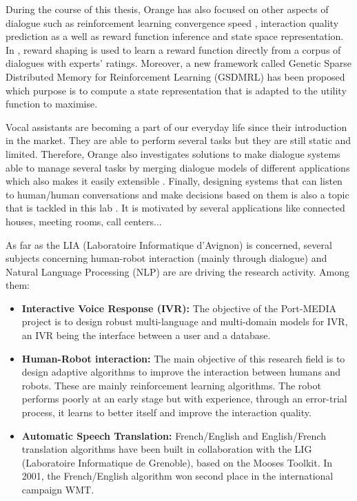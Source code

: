                 During the course of this thesis, Orange has also focused on other aspects of dialogue such as reinforcement learning convergence speed \cite{El-Asri2013a}, interaction quality prediction \cite{El-Asri2012,El-Asri2014d} as a well as reward function inference and state space representation. In \cite{El-Asri2012}, reward shaping is used to learn a reward function directly from a corpus of dialogues with experts' ratings. Moreover, a new framework called Genetic Sparse Distributed Memory for Reinforcement Learning (GSDMRL) has been proposed \cite{El-Asri2016} which purpose is to compute a state representation that is adapted to the utility function to maximise.
								
								Vocal assistants are becoming a part of our everyday life since their introduction in the market. They are able to perform several tasks but they are still static and limited. Therefore, Orange also investigates solutions to make dialogue systems able to manage several tasks by merging dialogue models of different applications which also makes it easily extensible \cite{EkeinhorKomi2014}. Finally, designing systems that can listen to human/human conversations and make decisions based on them is also a topic that is tackled in this lab \cite{Barlier2015}. It is motivated by several applications like connected houses, meeting rooms, call centers...

                As far as the LIA (Laboratoire Informatique d'Avignon) is concerned, several subjects concerning human-robot interaction (mainly through dialogue) and Natural Language Processing (NLP) are are driving the research activity. Among them:

                \begin{itemize}
                  \item \textbf{Interactive Voice Response (IVR):} The objective of the Port-MEDIA project is to design robust multi-language and multi-domain models for IVR, an IVR being the interface between a user and a database.
                  \item \textbf{Human-Robot interaction:} The main objective of this research field is to design adaptive algorithms to improve the interaction between humans and robots. These are mainly reinforcement learning algorithms. The robot performs poorly at an early stage but with experience, through an error-trial process, it learns to better itself and improve the interaction quality.
                  \item \textbf{Automatic Speech Translation:} French/English and English/French translation algorithms have been built in collaboration with the LIG (Laboratoire Informatique de Grenoble), based on the Mooses Toolkit. In 2001, the French/English algorithm won second place in the international campaign WMT.
                \end{itemize}

